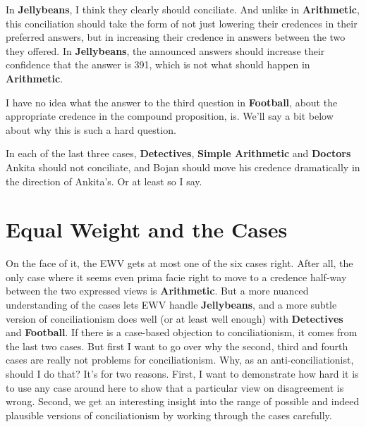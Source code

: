 In \textbf{Jellybeans}, I think they clearly should conciliate. And unlike in \textbf{Arithmetic}, this conciliation should take the form of not just lowering their credences in their preferred answers, but in increasing their credence in answers between the two they offered. In \textbf{Jellybeans}, the announced answers should increase their confidence that the answer is 391, which is not what should happen in \textbf{Arithmetic}.

I have no idea what the answer to the third question in \textbf{Football}, about the appropriate credence in the compound proposition, is. We'll say a bit below about why this is such a hard question.

In each of the last three cases, \textbf{Detectives}, \textbf{Simple Arithmetic} and \textbf{Doctors} \gls{Ankita} should not conciliate, and \gls{Bojan} should move his credence dramatically in the direction of \gls{Ankita}'s. Or at least so I say.

\section{Equal Weight and the Cases}
\label{equalweightandthecases}

On the face of it, the EWV gets at most one of the six cases right. After all, the only case where it seems even prima facie right to move to a credence half-way between the two expressed views is \textbf{Arithmetic}. But a more nuanced understanding of the cases lets EWV handle \textbf{Jellybeans}, and a more subtle version of conciliationism does well (or at least well enough) with \textbf{Detectives} and \textbf{Football}. If there is a case-based objection to conciliationism, it comes from the last two cases. But first I want to go over why the second, third and fourth cases are really not problems for conciliationism. Why, as an anti-conciliationist, should I do that? It's for two reasons. First, I want to demonstrate how hard it is to use any case around here to show that a particular view on disagreement is wrong. Second, we get an interesting insight into the range of possible and indeed plausible versions of conciliationism by working through the cases carefully.

